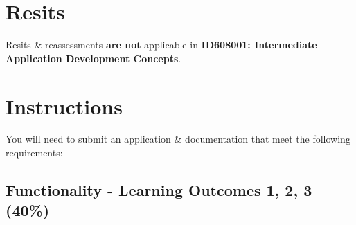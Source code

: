 \documentclass{article}
\begin{document}
\section*{Resits}
Resits \& reassessments \textbf{are not} applicable in \textbf{ID608001: Intermediate Application Development Concepts}.

\section*{Instructions}
You will need to submit an application \& documentation that meet the following requirements:

\subsection*{Functionality - Learning Outcomes 1, 2, 3 (40\%)}
\end{document}
